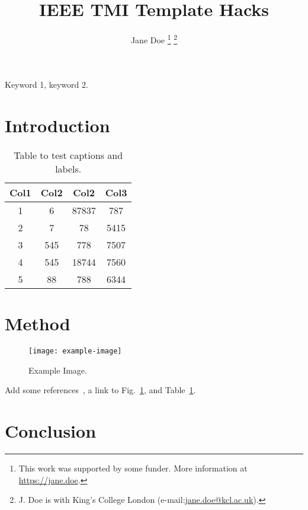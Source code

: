 \documentclass[journal,twoside,web]{ieeecolor}
\newcommand{\figref}[1]{Fig.~\ref{#1}}
\newcommand{\tabref}[1]{Table~\ref{#1}}
\begin{document}

\title{IEEE TMI Template Hacks}
\author{Jane Doe
\thanks{This work was supported by some funder. 
More information at \url{https://jane.doe}.}%
\thanks{J. Doe is with King's College London (e-mail:\href{mailto:jane.doe@kcl.ac.uk}{jane.doe@kcl.ac.uk}). }%
}


\maketitle

\begin{abstract}
\blindtext
\end{abstract}

\begin{IEEEkeywords}
Keyword 1, keyword 2.
\end{IEEEkeywords}

\section{Introduction}
\blindtext[2]

\begin{table}[tbh!]
\caption{Table to test captions and labels.\label{tab:example}}
\centering
\begin{tabular}{|c c c c|} 
 \hline
 Col1 & Col2 & Col2 & Col3 \\ [0.5ex] 
 \hline\hline
 1 & 6 & 87837 & 787 \\ 
 2 & 7 & 78 & 5415 \\
 3 & 545 & 778 & 7507 \\
 4 & 545 & 18744 & 7560 \\
 5 & 88 & 788 & 6344 \\ [1ex] 
 \hline
\end{tabular}
\end{table}

\section{Method}
\blindmathpaper

\begin{figure}[tbh!]
\centering
\texttt{[image: example-image]}
\caption{Example Image.\label{fig:example}}
\end{figure}

\blindtext
Add some references~\cite{article-full,inproceedings-full,phdthesis-full,Fidon:PAMI:2024,Bakas:arXiv:2018,Alabi:MedIA:2025}, a link to \figref{fig:example}, and \tabref{tab:example}.

\section{Conclusion}
\blindtext[3]



 
\end{document}
